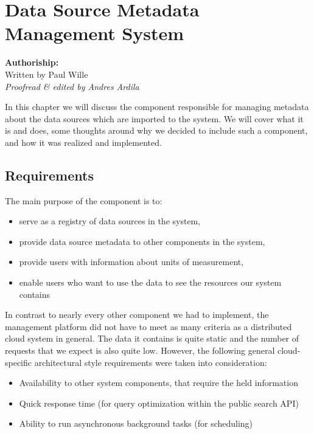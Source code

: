 \section{Data Source Metadata Management System}\label{sec:metadata}

\textbf{Authoriship:} \\
Written by Paul Wille \\
\emph{Proofread \& edited by Andres Ardila}
\vspace{12 pt}

In this chapter we will discuss the component responsible for managing
metadata about the data sources which are imported to the system. We
will cover what it is and does, some thoughts around why we decided to
include such a component, and how it was realized and implemented.

\subsection{Requirements}\label{requirements}

The main purpose of the component is to:

\begin{itemize}
\tightlist
\item
  serve as a registry of data sources in the system,
\item
  provide data source metadata to other components in the system,
\item
  provide users with information about units of measurement,
\item
  enable users who want to use the data to see the resources our system
  contains
\end{itemize}

In contrast to nearly every other component we had to implement, the
management platform did not have to meet as many criteria as a
distributed cloud system in general. The data it contains is quite
static and the number of requests that we expect is also quite low.
However, the following general cloud-specific architectural style
requirements were taken into consideration:

\begin{itemize}
\tightlist
\item
  Availability to other system components, that require the held
  information
\item
  Quick response time (for query optimization within the public search
  API)
\item
  Ability to run asynchronous background tasks (for scheduling)
\end{itemize}

